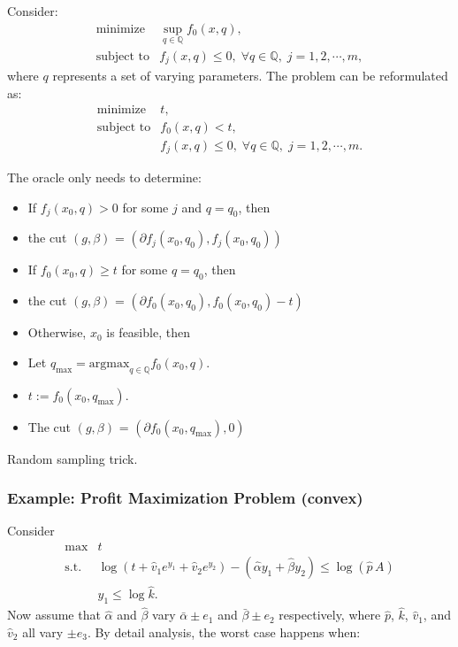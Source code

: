 \documentclass[final,leqno]{siamltex}
\providecommand{\tightlist}{%
  \setlength{\itemsep}{0pt}\setlength{\parskip}{0pt}}
\begin{document}
Consider:
\begin{equation}\begin{array}{ll}
    \text{minimize}   & \sup_{q \in \mathbb Q} f_0(x,q), \\
    \text{subject to} & f_j(x,q) \leq 0, \;
            \forall q \in {\mathbb Q}, \; j = 1,2,\cdots,m,
  \end{array}
\label{eq:robust-optim}\end{equation}
where \(q\) represents a set of varying parameters. The problem can be reformulated as:
\[\begin{array}{ll}
    \text{minimize}   & t, \\
    \text{subject to} & f_0(x,q) < t,  \\
                      & f_j(x,q) \leq 0, \;
            \forall q \in {\mathbb Q}, \; j = 1,2,\cdots,m.
  \end{array}
\]

The oracle only needs to determine:

\begin{itemize}
\tightlist
\item
  If \(f_j(x_0, q) > 0\) for some \(j\) and \(q = q_0\), then
\item
  the cut \((g, \beta)\) = \((\partial f_j(x_0, q_0), f_j(x_0, q_0))\)
\item
  If \(f_0(x_0, q) \geq t\) for some \(q = q_0\), then
\item
  the cut \((g, \beta)\) = \((\partial f_0(x_0, q_0), f_0(x_0, q_0) - t)\)
\item
  Otherwise, \(x_0\) is feasible, then
\item
  Let \(q_{\max} = \text{argmax}_{q \in \mathbb Q} f_0(x_0, q)\).
\item
  \(t := f_0(x_0, q_{\max})\).
\item
  The cut \((g, \beta)\) = \((\partial f_0(x_0, q_{\max}), 0)\)
\end{itemize}

Random sampling trick.

\hypertarget{sec:example-profit-maximization-problem-convex}{%
\subsubsection{Example: Profit Maximization Problem (convex)}\label{sec:example-profit-maximization-problem-convex}}

Consider
\[\begin{array}{ll}
    \text{max}  & t \\
    \text{s.t.} & \log(t + \hat{v}_1 e^{y_1} + \hat{v}_2 e^{y_2}) - 
                        (\hat{\alpha} y_1 + \hat{\beta} y_2) \le \log(\hat{p}\,A)  \\
                & y_1 \le \log \hat{k} .
  \end{array}
\]
Now assume that \(\hat{\alpha}\) and \(\hat{\beta}\) vary \(\bar{\alpha} \pm e_1\) and \(\bar{\beta} \pm e_2\) respectively, where \(\hat{p}\), \(\hat{k}\), \(\hat{v}_1\), and \(\hat{v}_2\) all vary \(\pm e_3\). By detail analysis, the worst case happens when:
\end{document}
